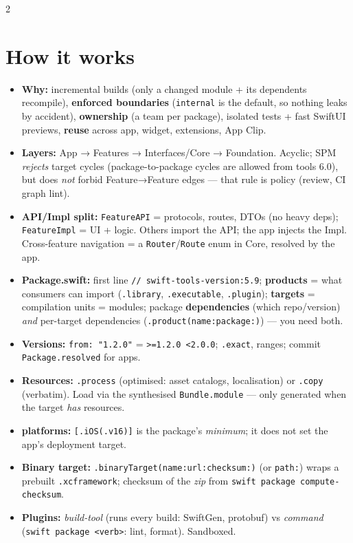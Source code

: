 \documentclass[8pt]{extarticle}
\begin{document}
\begin{multicols}{2}
\raggedright

\section{How it works}
\begin{itemize}
  \item \textbf{Why:} incremental builds (only a changed module + its dependents recompile),
        \textbf{enforced boundaries} (\texttt{internal} is the default, so nothing leaks
        by accident), \textbf{ownership} (a team per package), isolated tests + fast
        SwiftUI previews, \textbf{reuse} across app, widget, extensions, App Clip.
  \item \textbf{Layers:} App → Features → Interfaces/Core → Foundation. Acyclic;
        SPM \emph{rejects} target cycles (package-to-package cycles are allowed from
        tools 6.0), but does \emph{not} forbid Feature→Feature edges — that rule is
        policy (review, CI graph lint).
  \item \textbf{API/Impl split:} \texttt{FeatureAPI} = protocols, routes, DTOs (no heavy
        deps); \texttt{FeatureImpl} = UI + logic. Others import the API; the app injects
        the Impl. Cross-feature navigation = a \texttt{Router}/\texttt{Route} enum in Core,
        resolved by the app.
  \item \textbf{Package.swift:} first line \texttt{// swift-tools-version:5.9};
        \textbf{products} = what consumers can import (\texttt{.library}, \texttt{.executable},
        \texttt{.plugin}); \textbf{targets} = compilation units = modules; package
        \textbf{dependencies} (which repo/version) \emph{and} per-target dependencies
        (\texttt{.product(name:package:)}) — you need both.
  \item \textbf{Versions:} \texttt{from: "1.2.0"} = \texttt{>=1.2.0 <2.0.0};
        \texttt{.exact}, ranges; commit \texttt{Package.resolved} for apps.
  \item \textbf{Resources:} \texttt{.process} (optimised: asset catalogs, localisation)
        or \texttt{.copy} (verbatim). Load via the synthesised \texttt{Bundle.module} —
        only generated when the target \emph{has} resources.
  \item \textbf{platforms:} \texttt{[.iOS(.v16)]} is the package's \emph{minimum};
        it does not set the app's deployment target.
  \item \textbf{Binary target:} \texttt{.binaryTarget(name:url:checksum:)} (or
        \texttt{path:}) wraps a prebuilt \texttt{.xcframework}; checksum of the
        \emph{zip} from \texttt{swift package compute-checksum}.
  \item \textbf{Plugins:} \emph{build-tool} (runs every build: SwiftGen, protobuf) vs
        \emph{command} (\texttt{swift package <verb>}: lint, format). Sandboxed.
\end{itemize}


\end{multicols}
\end{document}
